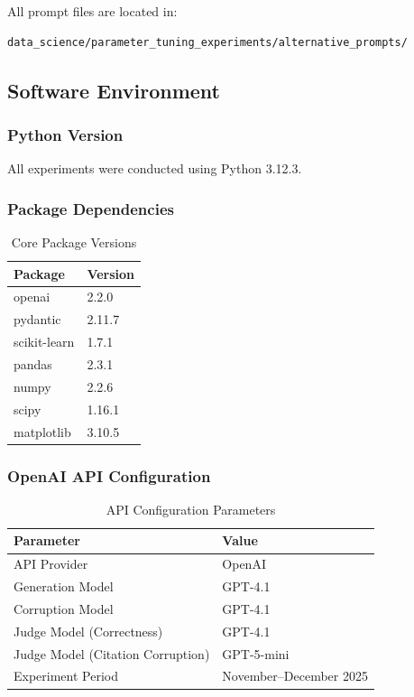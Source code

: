 \documentclass{article}
\begin{document}
All prompt files are located in:
\begin{verbatim}
data_science/parameter_tuning_experiments/alternative_prompts/
\end{verbatim}

\subsection{Software Environment}
\label{sec:software_env}

\subsubsection{Python Version}

All experiments were conducted using Python 3.12.3.

\subsubsection{Package Dependencies}

\begin{table}[H]
\centering
\caption{Core Package Versions}
\label{tab:packages}
\begin{tabular}{ll}
\toprule
\textbf{Package} & \textbf{Version} \\
\midrule
openai & 2.2.0 \\
pydantic & 2.11.7 \\
scikit-learn & 1.7.1 \\
pandas & 2.3.1 \\
numpy & 2.2.6 \\
scipy & 1.16.1 \\
matplotlib & 3.10.5 \\
\bottomrule
\end{tabular}
\end{table}

\subsubsection{OpenAI API Configuration}

\begin{table}[H]
\centering
\caption{API Configuration Parameters}
\label{tab:api_config}
\begin{tabular}{ll}
\toprule
\textbf{Parameter} & \textbf{Value} \\
\midrule
API Provider & OpenAI \\
Generation Model & GPT-4.1 \\
Corruption Model & GPT-4.1 \\
Judge Model (Correctness) & GPT-4.1 \\
Judge Model (Citation Corruption) & GPT-5-mini \\
Experiment Period & November--December 2025 \\
\bottomrule
\end{tabular}
\end{table}
\end{document}
